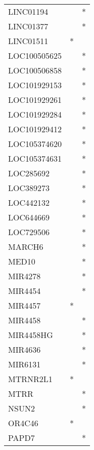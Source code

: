 \begin{longtable}{lcc}
LINC01194     &                &          * \\
LINC01377     &                &          * \\
LINC01511     &              * &            \\
LOC100505625  &                &          * \\
LOC100506858  &                &          * \\
LOC101929153  &                &          * \\
LOC101929261  &                &          * \\
LOC101929284  &                &          * \\
LOC101929412  &                &          * \\
LOC105374620  &                &          * \\
LOC105374631  &                &          * \\
LOC285692     &                &          * \\
LOC389273     &                &          * \\
LOC442132     &                &          * \\
LOC644669     &                &          * \\
LOC729506     &                &          * \\
MARCH6        &                &          * \\
MED10         &                &          * \\
MIR4278       &                &          * \\
MIR4454       &                &          * \\
MIR4457       &              * &            \\
MIR4458       &                &          * \\
MIR4458HG     &                &          * \\
MIR4636       &                &          * \\
MIR6131       &                &          * \\
MTRNR2L1      &              * &            \\
MTRR          &                &          * \\
NSUN2         &                &          * \\
OR4C46        &              * &            \\
PAPD7         &                &          * \\

\end{longtable}
